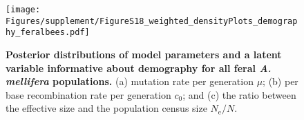 \documentclass[a4paper, 12pt]{article}
\begin{document}
\begin{figure}[ht]
  \centering
  \texttt{[image: Figures/supplement/FigureS18\_weighted\_densityPlots\_demography\_feralbees.pdf]}
  \small\caption{\textbf{Posterior distributions of model parameters and a latent variable informative about demography for all feral \textit{A. mellifera} populations.} (a) mutation rate per generation $\mu$; (b) per base recombination rate per generation $c_{\mathrm{0}}$; and (c) the ratio between the effective size and the population census size $N_{\mathrm{e}}/N$.}
  \label{fig:supple_feralbee_densitydemo}
\end{figure}
\end{document}
